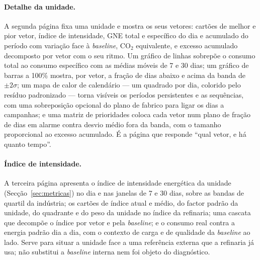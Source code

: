 \paragraph{Detalhe da unidade.} A segunda página fixa uma unidade e mostra
os seus vetores: cartões de melhor e pior vetor, índice de intensidade,
GNE total e específico do dia e acumulado do período com variação face à
\emph{baseline}, CO$_2$ equivalente, e excesso acumulado decomposto por
vetor com o seu ritmo. Um gráfico de linhas sobrepõe o consumo total ao
consumo específico com as médias móveis de 7 e 30 dias; um gráfico de
barras a 100\% mostra, por vetor, a fração de dias abaixo e acima da
banda de $\pm2\sigma$; um mapa de calor de calendário --- um quadrado por
dia, colorido pelo resíduo padronizado --- torna visíveis os períodos
persistentes e as sequências, com uma sobreposição opcional do plano de
fabrico para ligar os dias a campanhas; e uma matriz de prioridades coloca
cada vetor num plano de fração de dias em alarme contra desvio médio
fora da banda, com o tamanho proporcional ao excesso acumulado. É a
página que responde ``qual vetor, e há quanto tempo''.

\paragraph{Índice de intensidade.} A terceira página apresenta o índice
de intensidade energética da unidade (Secção~\ref{sec:metricas}) no dia e
nas janelas de 7 e 30 dias, sobre as bandas de quartil da indústria; os
cartões de índice atual e médio, do factor padrão da unidade, do quadrante
e do peso da unidade no índice da refinaria; uma cascata que decompõe o
índice por vetor e pela \emph{baseline}; e o consumo real contra a energia
padrão dia a dia, com o contexto de carga e de qualidade da
\emph{baseline} ao lado. Serve para situar a unidade face a uma referência
externa que a refinaria já usa; não substitui a \emph{baseline} interna nem
foi objeto do diagnóstico.

